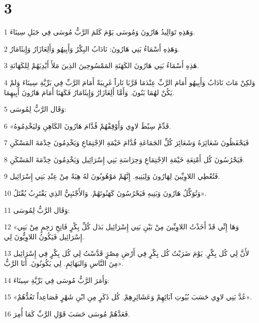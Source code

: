 \chapter{3}

\par 1 وَهَذِهِ تَوَالِيدُ هَارُونَ وَمُوسَى يَوْمَ كَلمَ الرَّبُّ مُوسَى فِي جَبَلِ سِينَاءَ.
\par 2 وَهَذِهِ أَسْمَاءُ بَنِي هَارُونَ: نَادَابُ البِكْرُ وَأَبِيهُو وَأَلِعَازَارُ وَإِيثَامَارُ.
\par 3 هَذِهِ أَسْمَاءُ بَنِي هَارُونَ الكَهَنَةِ المَمْسُوحِينَ الذِينَ مَلأَ أَيْدِيَهُمْ لِلكَهَانَةِ.
\par 4 وَلكِنْ مَاتَ نَادَابُ وَأَبِيهُو أَمَامَ الرَّبِّ عِنْدَمَا قَرَّبَا نَاراً غَرِيبَةً أَمَامَ الرَّبِّ فِي بَرِّيَّةِ سِينَاءَ وَلمْ يَكُنْ لهُمَا بَنُونَ. وَأَمَّا أَلِعَازَارُ وَإِيثَامَارُ فَكَهَنَا أَمَامَ هَارُونَ أَبِيهِمَا.
\par 5 وَقَال الرَّبُّ لِمُوسَى:
\par 6 «قَدِّمْ سِبْطَ لاوِي وَأَوْقِفْهُمْ قُدَّامَ هَارُونَ الكَاهِنِ وَليَخْدِمُوهُ.
\par 7 فَيَحْفَظُونَ شَعَائِرَهُ وَشَعَائِرَ كُلِّ الجَمَاعَةِ قُدَّامَ خَيْمَةِ الاِجْتِمَاعِ وَيَخْدِمُونَ خِدْمَةَ المَسْكَنِ
\par 8 فَيَحْرُسُونَ كُل أَمْتِعَةِ خَيْمَةِ الاِجْتِمَاعِ وَحِرَاسَةِ بَنِي إِسْرَائِيل وَيَخْدِمُونَ خِدْمَةَ المَسْكَنِ.
\par 9 فَتُعْطِي اللاوِيِّينَ لِهَارُونَ وَلِبَنِيهِ. إِنَّهُمْ مَوْهُوبُونَ لهُ هِبَةً مِنْ عِنْدِ بَنِي إِسْرَائِيل.
\par 10 وَتُوَكِّلُ هَارُونَ وَبَنِيهِ فَيَحْرُسُونَ كَهَنُوتَهُمْ. وَالأَجْنَبِيُّ الذِي يَقْتَرِبُ يُقْتَلُ».
\par 11 وَقَال الرَّبُّ لِمُوسَى:
\par 12 «وَهَا إِنِّي قَدْ أَخَذْتُ اللاوِيِّينَ مِنْ بَيْنِ بَنِي إِسْرَائِيل بَدَل كُلِّ بِكْرٍ فَاتِحِ رَحِمٍ مِنْ بَنِي إِسْرَائِيل فَيَكُونُ اللاوِيُّونَ لِي.
\par 13 لأَنَّ لِي كُل بِكْرٍ. يَوْمَ ضَرَبْتُ كُل بِكْرٍ فِي أَرْضِ مِصْرٍَ قَدَّسْتُ لِي كُل بِكْرٍ فِي إِسْرَائِيل مِنَ النَّاسِ وَالبَهَائِمِ. لِي يَكُونُونَ. أَنَا الرَّبُّ».
\par 14 وَأَمَرَ الرَّبُّ مُوسَى فِي بَرِّيَّةِ سِينَاءَ:
\par 15 «عُدَّ بَنِي لاوِي حَسَبَ بُيُوتِ آبَائِهِمْ وَعَشَائِرِهِمْ. كُل ذَكَرٍ مِنِ ابْنِ شَهْرٍ فَصَاعِداً تَعُدُّهُمْ».
\par 16 فَعَدَّهُمْ مُوسَى حَسَبَ قَوْلِ الرَّبِّ كَمَا أُمِرَ.
